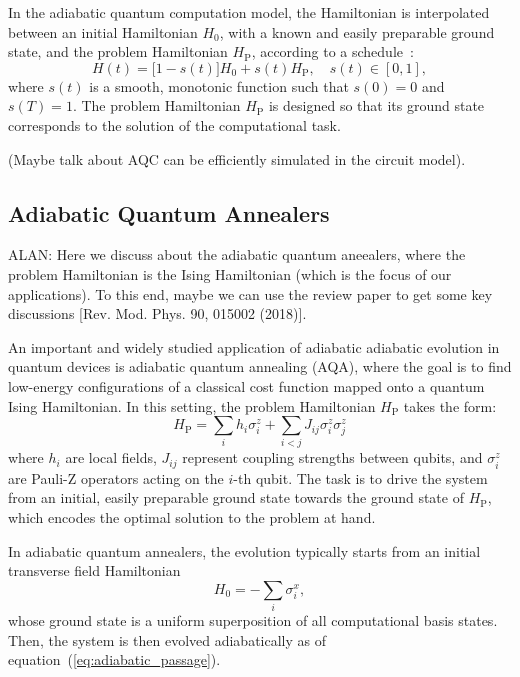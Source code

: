 In the adiabatic quantum computation model, the Hamiltonian is interpolated between an
initial Hamiltonian $H_0$, with a known and easily preparable ground state, and the problem
Hamiltonian $H_\mathrm{P}$, according to a schedule~\cite{albash_adiabatic_2018}:
\begin{equation}
    H(t) = \big[1 - s(t)\big] H_0 + s(t) H_\mathrm{P}, \quad s(t) \in [0,1],
    \label{eq:adiabatic_passage}
\end{equation}
where $s(t)$ is a smooth, monotonic function such that $s(0)=0$ and $s(T)=1$. The problem
Hamiltonian $H_\mathrm{P}$ is designed so that its ground state corresponds to the solution
of the computational task.

(Maybe talk about AQC can be efficiently simulated in the circuit model).

\subsection{Adiabatic Quantum Annealers}

{\color{blue}ALAN: Here we discuss about the adiabatic quantum aneealers, where the problem Hamiltonian
is the Ising Hamiltonian (which is the focus of our applications). To this end, maybe we can use the
review paper to get some key discussions [Rev. Mod. Phys. 90, 015002 (2018)].}

An important and widely studied application of adiabatic adiabatic evolution in quantum
devices is adiabatic quantum annealing (AQA), where the goal is to find low-energy configurations of
a classical cost function mapped onto a quantum Ising Hamiltonian. In this setting, the problem
Hamiltonian $H_\mathrm{P}$ takes the form:
$$H_\mathrm{P} = \sum_i h_i \sigma_i^z + \sum_{i<j} J_{ij} \sigma_i^z \sigma_j^z$$
where $h_i$ are local fields, $J_{ij}$ represent coupling strengths between qubits, and
$\sigma_i^z$ are Pauli-Z operators acting on the $i$-th qubit. The task is to drive the system
from an initial, easily preparable ground state towards the ground state of $H_\mathrm{P}$,
which encodes the optimal solution to the problem at hand.

In adiabatic quantum annealers, the evolution typically starts from an initial transverse
field Hamiltonian 
$$H_0 = -\sum_i \sigma_i^x,$$
whose ground state is a uniform superposition of all computational basis states. Then,
the system is then evolved adiabatically as of equation~(\ref{eq:adiabatic_passage}).

